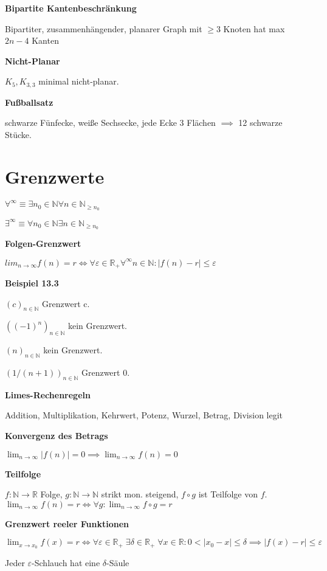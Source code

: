 \documentclass[a4paper,10pt]{article}
\newcommand{\N}{\mathbb{N}}
\newcommand{\natnum}{\mathbb{N}}
\newcommand{\R}{\mathbb{R}}
\newcommand{\realnum}{\mathbb{R}}
\renewcommand{\epsilon}{\varepsilon}
\begin{document}
\begin{multicols}{3}
\textbf{Bipartite Kantenbeschränkung}

Bipartiter, zusammenhängender, planarer Graph mit $\ge3$ Knoten hat max $2n-4$ Kanten

\textbf{Nicht-Planar}

$K_5, K_{3,3}$ minimal nicht-planar.

\textbf{Fußballsatz}

schwarze Fünfecke, weiße Sechsecke, jede Ecke 3 Flächen $\implies$ 12 schwarze Stücke.

\section{Grenzwerte}

$\forall^\infty \equiv \exists n_0 \in \natnum \forall n \in \natnum_{\geq n_0}$

$\exists^\infty \equiv \forall n_0 \in \natnum \exists n \in \natnum_{\geq n_0}$

\textbf{Folgen-Grenzwert}

$lim_{n\to\infty} f(n) = r \iff \forall \varepsilon \in \realnum_+ \forall^\infty n \in \natnum: |f(n) - r| \leq \varepsilon$

\textbf{Beispiel 13.3}

$(c)_{n\in \natnum}$ Grenzwert c.

$((-1)^n)_{n \in \natnum}$ kein Grenzwert.

$(n)_{n \in \natnum}$ kein Grenzwert.

$(1/(n+1))_{n \in \natnum}$ Grenzwert 0.

\textbf{Limes-Rechenregeln}

Addition, Multiplikation, Kehrwert, Potenz, Wurzel, Betrag, Division legit

\textbf{Konvergenz des Betrags}

$\lim_{n\to\infty} |f(n)|=0 \implies \lim_{n\to\infty} f(n)=0$

\textbf{Teilfolge}

$f:\N\to\R$ Folge, $g:\N\to\N$ strikt mon. steigend, $f\circ g$ ist Teilfolge von $f$. $\lim_{n\to\infty}f(n)=r \iff \forall g: \lim_{n\to\infty} f\circ g = r$

\textbf{Grenzwert reeler Funktionen}

$\lim_{x\to x_0}f(x) = r \iff \forall \epsilon\in\R_+\; \exists \delta\in\R_+\; \forall x\in\R: 0 < |x_0-x| \le \delta \implies |f(x)-r| \le \epsilon$

Jeder $\epsilon$-Schlauch hat eine $\delta$-Säule


\end{multicols}
\end{document}
